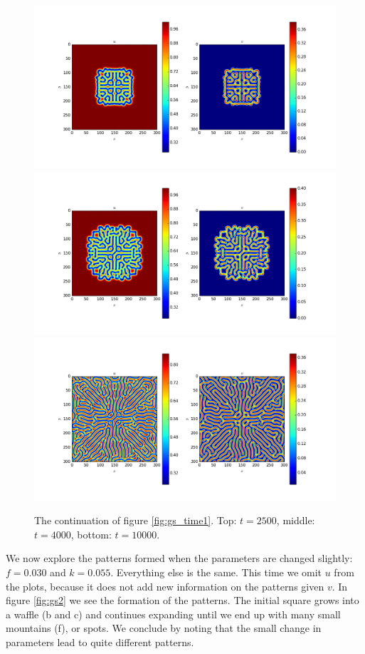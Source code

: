 \documentclass[a4paper]{article}
\begin{document}
\begin{figure}
    \centering
    \includegraphics[width=12cm]{gs_2500}
    \includegraphics[width=12cm]{gs_4000}
    \includegraphics[width=12cm]{gs_10000}
    \caption{The continuation of figure \ref{fig:gs_time1}. Top: $t=2500$, middle: $t=4000$, bottom: $t=10000$.}
    \label{fig:gs_time2}
\end{figure}

We now explore the patterns formed when the parameters are changed slightly: $f=0.030$ and $k=0.055$. Everything else is the same. This time we omit $u$ from the plots, because it does not add new information on the patterns given $v$. In figure \ref{fig:gs2} we see the formation of the patterns. The initial square grows into a waffle (b and c) and continues expanding until we end up with many small mountains (f), or spots. We conclude by noting that the small change in parameters lead to quite different patterns.
\end{document}
